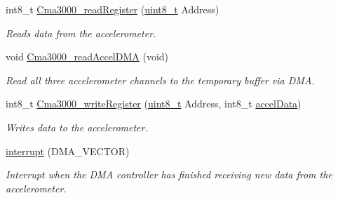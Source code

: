 \begin{DoxyCompactItemize}
int8\-\_\-t \hyperlink{group__HAL__Cma3000_ga3de7d450377baf2c888e76f419cfc21e}{Cma3000\-\_\-read\-Register} (\hyperlink{typedefs_8h_aba7bc1797add20fe3efdf37ced1182c5}{uint8\-\_\-t} Address)
\begin{DoxyCompactList}\small\item\em Reads data from the accelerometer. \end{DoxyCompactList}\item 
void \hyperlink{group__HAL__Cma3000_ga7be472db252aa760998fd4f155f2c132}{Cma3000\-\_\-read\-Accel\-D\-M\-A} (void)
\begin{DoxyCompactList}\small\item\em Read all three accelerometer channels to the temporary buffer via D\-M\-A. \end{DoxyCompactList}\item 
int8\-\_\-t \hyperlink{group__HAL__Cma3000_gafc0c3a516edbfc2e87c514b51b595678}{Cma3000\-\_\-write\-Register} (\hyperlink{typedefs_8h_aba7bc1797add20fe3efdf37ced1182c5}{uint8\-\_\-t} Address, int8\-\_\-t \hyperlink{group__HAL__Cma3000_ga2463200b1bea9027c65cd6a7988b92cc}{accel\-Data})
\begin{DoxyCompactList}\small\item\em Writes data to the accelerometer. \end{DoxyCompactList}\item 
\hyperlink{group__HAL__Cma3000_gac61bc22c3bb5b6ef2292d1e11e026861}{interrupt} (D\-M\-A\-\_\-\-V\-E\-C\-T\-O\-R)
\begin{DoxyCompactList}\small\item\em Interrupt when the D\-M\-A controller has finished receiving new data from the accelerometer. \end{DoxyCompactList}\end{DoxyCompactItemize}
